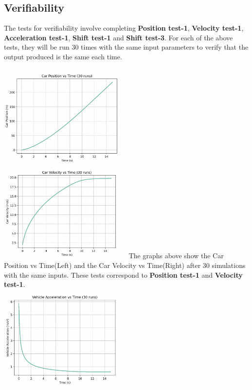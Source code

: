 \documentclass[12pt, titlepage]{article}
\begin{document}
\subsection{Verifiability}
The tests for verifiability involve completing \textbf{Position test-1}, \textbf{Velocity test-1}, \textbf{Acceleration test-1}, \textbf{Shift test-1} and \textbf{Shift test-3}.
For each of the above tests, they will be run 30 times with the same input parameters to verify that the output produced is the same each time. 


\includegraphics[width=0.5\textwidth]{simulation-figures/car_position_30.png}
\includegraphics[width=0.5\textwidth]{simulation-figures/car_velocity30.png}
\noindent The graphs above show the Car Position vs Time(Left) and the Car Velocity vs Time(Right) after 30 simulations with the same inputs.
These tests correspond to \textbf{Position test-1} and \textbf{Velocity test-1}. \\
\includegraphics[width=0.5\textwidth]{simulation-figures/vehicle_acceleration30.png}
\end{document}

